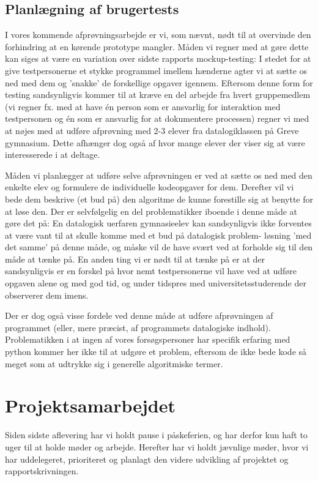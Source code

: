 \documentclass[10pt,a4paper,danish]{article}
\begin{document}
\subsection{Planlægning af brugertests}
I vores kommende afprøvningsarbejde er vi, som nævnt, nødt til at overvinde den forhindring at en
kørende prototype mangler. Måden vi regner med at gøre dette kan siges at være en variation over 
sidste rapports mockup-testing: I stedet for at give testpersonerne et stykke programmel imellem 
hænderne agter vi at sætte os ned med dem og 'snakke' de forskellige opgaver igennem. Eftersom denne
form for testing sandsynligvis kommer til at kræve en del arbejde fra hvert gruppemedlem (vi regner
fx. med at have én person som er ansvarlig for interaktion med testpersonen og én som er ansvarlig 
for at dokumentere processen) regner vi med at nøjes med at udføre afprøvning med 2-3 elever fra 
datalogiklassen på Greve gymnasium. Dette afhænger dog også af hvor mange elever der viser sig at 
være interesserede i at deltage. 

Måden vi planlægger at udføre selve afprøvningen er ved at sætte os ned med den enkelte elev
og formulere de individuelle kodeopgaver for dem. Derefter vil vi bede dem beskrive (et bud på)
den algoritme de kunne forestille sig at benytte for at løse den. Der er selvfølgelig en del 
problematikker iboende i denne måde at gøre det på: En datalogisk uerfaren gymnasieelev kan 
sandsynligvis ikke forventes at være vant til at skulle komme med et bud på datalogisk problem-
løsning 'med det samme' på denne måde, og måske vil de have svært ved at forholde sig til den
måde at tænke på. En anden ting vi er nødt til at tænke på er at der sandsynligvis er en forskel
på hvor nemt testpersonerne vil have ved at udføre opgaven alene og med god tid, og under tidspres
med universitetsstuderende der observerer dem imens. 

Der er dog også visse fordele ved denne måde at udføre afprøvningen af programmet (eller, 
mere præcist, af programmets datalogiske indhold). Problematikken i at ingen af vores 
forsøgspersoner har specifik erfaring med python kommer her ikke til at udgøre et problem, 
eftersom de ikke bede kode så meget som at udtrykke sig i generelle algoritmiske termer. 

\section{Projektsamarbejdet}
Siden sidste aflevering har vi holdt pause i påskeferien, og har derfor kun haft to uger til at holde møder og arbejde. Herefter har vi holdt jævnlige møder, hvor vi har uddelegeret, prioriteret og planlagt den videre udvikling af projektet og rapportskrivningen. 
\end{document}

